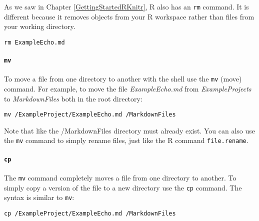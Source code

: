 As we saw in Chapter \ref{GettingStartedRKnitr}, R also has an \texttt{rm} command. It is different because it removes objects from your R workspace rather than files from your working directory.

\begin{knitrout}
\color{fgcolor}\begin{kframe}
\begin{verbatim}
rm ExampleEcho.md
\end{verbatim}
\end{kframe}
\end{knitrout}


\paragraph{{\tt{mv}}}

To move a file from one directory to another with the shell use the \texttt{mv} (move) command. For example, to move the file \emph{ExampleEcho.md} from \emph{ExampleProjects} to \emph{MarkdownFiles} both in the root directory:

\begin{knitrout}
\color{fgcolor}\begin{kframe}
\begin{verbatim}
mv /ExampleProject/ExampleEcho.md /MarkdownFiles
\end{verbatim}
\end{kframe}
\end{knitrout}


\noindent Note that like the /MarkdownFiles directory must already exist. You can also use the \texttt{mv} command to simply rename files, just like the R command \texttt{file.rename}.

\paragraph{{\tt{cp}}}

The \texttt{mv} command completely moves a file from one directory to another. To simply copy a version of the file to a new directory use the \texttt{cp} command. The syntax is similar to \texttt{mv}:

\begin{knitrout}
\color{fgcolor}\begin{kframe}
\begin{verbatim}
cp /ExampleProject/ExampleEcho.md /MarkdownFiles
\end{verbatim}
\end{kframe}
\end{knitrout}



